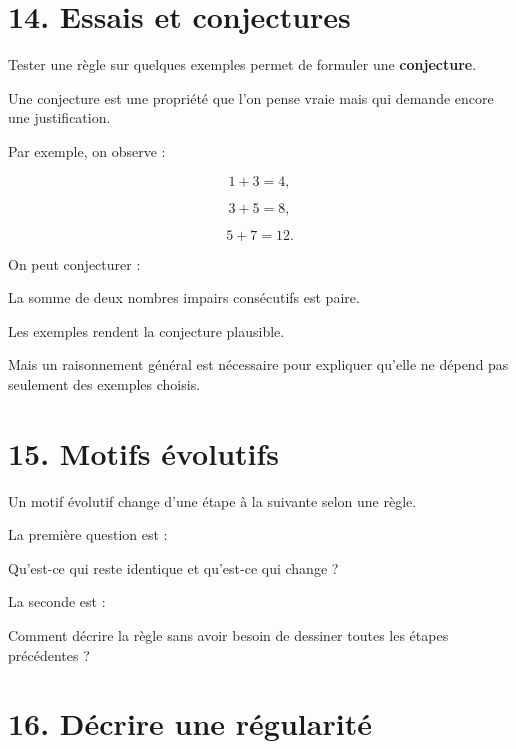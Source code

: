 \section{14. Essais et conjectures}

Tester une règle sur quelques exemples permet de formuler une \textbf{conjecture}.

Une conjecture est une propriété que l’on pense vraie mais qui demande encore une justification.

Par exemple, on observe :

\[
1+3=4,
\]

\[
3+5=8,
\]

\[
5+7=12.
\]

On peut conjecturer :

\begin{remarque}
La somme de deux nombres impairs consécutifs est paire.
\end{remarque}

Les exemples rendent la conjecture plausible.

Mais un raisonnement général est nécessaire pour expliquer qu’elle ne dépend pas seulement des exemples choisis.

\section{15. Motifs évolutifs}

Un motif évolutif change d’une étape à la suivante selon une règle.


La première question est :

\begin{remarque}
Qu’est-ce qui reste identique et qu’est-ce qui change ?
\end{remarque}

La seconde est :

\begin{remarque}
Comment décrire la règle sans avoir besoin de dessiner toutes les étapes précédentes ?
\end{remarque}

\section{16. Décrire une régularité}

